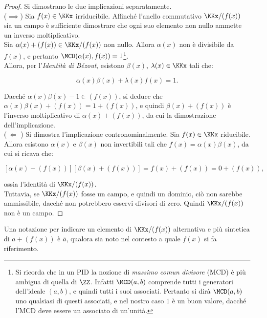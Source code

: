 \begin{proof}
    Si dimostrano le due implicazioni separatamente. \\

    ($\implies$)\; Sia $f(x) \in \KKx$ irriducibile. Affinché l'anello
    commutativo $\KKx/(f(x))$ sia un campo è sufficiente dimostrare
    che ogni suo elemento non nullo ammette un inverso moltiplicativo. \\

    Sia $\alpha(x) + (f(x)) \in \KKx/(f(x))$ non nullo. Allora
    $\alpha(x)$ non è divisibile da $f(x)$, e pertanto
    $\MCD(\alpha(x), f(x))=1$\footnote{Si ricorda che in un PID la
        nozione di \textit{massimo comun divisore} (MCD) è più ambigua
        di quella di $\ZZ$. Infatti $\MCD(a,b)$ comprende tutti i
        generatori dell'ideale $(a,b)$, e quindi tutti i suoi associati.
        Pertanto si dirà $\MCD(a,b)$ uno qualsiasi di questi associati,
        e nel nostro caso $1$ è un buon valore, dacché l'MCD deve essere
        un associato di un'unità.}. \\

    Allora, per l'\textit{Identità di Bézout}, esistono $\beta(x)$,
    $\lambda(x) \in \KKx$ tali che:

    \[ \alpha(x)\beta(x) + \lambda(x)f(x) = 1. \]

    Dacché $\alpha(x)\beta(x)-1 \in (f(x))$, si deduce che
    $\alpha(x)\beta(x)+(f(x))=1+(f(x))$, e quindi
    $\beta(x) + (f(x))$ è l'inverso moltiplicativo di $\alpha(x) +
        (f(x))$, da cui la dimostrazione dell'implicazione. \\

    ($\,\Longleftarrow\,\,$)\; Si dimostra l'implicazione
    contronominalmente. Sia $f(x) \in \KKx$ riducibile. Allora
    esistono $\alpha(x)$ e $\beta(x)$ non
    invertibili tali che $f(x)=\alpha(x)\beta(x)$, da cui si ricava che:

    \[[\alpha(x)+(f(x))][\beta(x)+(f(x))]=f(x)+(f(x))=0+(f(x)),\]

    \vskip 0.1in

    ossia l'identità di $\KKx/(f(x))$. \\

    Tuttavia, se $\KKx/(f(x))$ fosse un campo, e quindi un dominio,
    ciò non sarebbe ammissibile, dacché non potrebbero esservi
    divisori di zero. Quindi $\KKx/(f(x))$ non è un campo.

\end{proof}

\begin{remark*}
    Una notazione per indicare un elemento di $\KKx/(f(x))$ alternativa
    e più sintetica di $a+(f(x))$ è $\overline{a}$, qualora
    sia noto nel contesto a quale $f(x)$ si fa riferimento.
\end{remark*}

